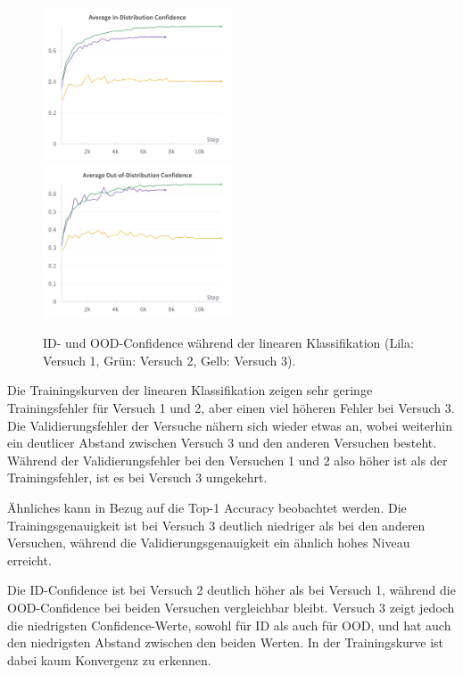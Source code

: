 \begin{figure}[]
	\centering
	\includegraphics[width=0.5\textwidth]{figure_results_supcon-lin_avg-id-conf.png}%
	\includegraphics[width=0.5\textwidth]{figure_results_supcon-lin_avg-ood-conf.png}
	\caption[ID- und OOD-Confidence während der linearen Klassifikation.]{ID- und OOD-Confidence während der linearen Klassifikation (\textcolor{exp1}{Lila}: Versuch 1, \textcolor{exp2}{Grün}: Versuch 2, \textcolor{exp3}{Gelb}: Versuch 3).}
	\label{fig:supcon-lin-ood-detection}
\end{figure}

Die Trainingskurven der linearen Klassifikation zeigen sehr geringe Trainingsfehler für Versuch 1 und 2, aber einen viel höheren Fehler bei Versuch 3. Die Validierungsfehler der Versuche nähern sich wieder etwas an, wobei weiterhin ein deutlicer Abstand zwischen Versuch 3 und den anderen Versuchen besteht. Während der Validierungsfehler bei den Versuchen 1 und 2 also höher ist als der Trainingsfehler, ist es bei Versuch 3 umgekehrt.

Ähnliches kann in Bezug auf die Top-1 Accuracy beobachtet werden. Die Trainingsgenauigkeit ist bei Versuch 3 deutlich niedriger als bei den anderen Versuchen, während die Validierungsgenauigkeit ein ähnlich hohes Niveau erreicht.

Die ID-Confidence ist bei Versuch 2 deutlich höher als bei Versuch 1, während die OOD-Confidence bei beiden Versuchen vergleichbar bleibt. Versuch 3 zeigt jedoch die niedrigsten Confidence-Werte, sowohl für ID als auch für OOD, und hat auch den niedrigsten Abstand zwischen den beiden Werten. In der Trainingskurve ist dabei kaum Konvergenz zu erkennen.

